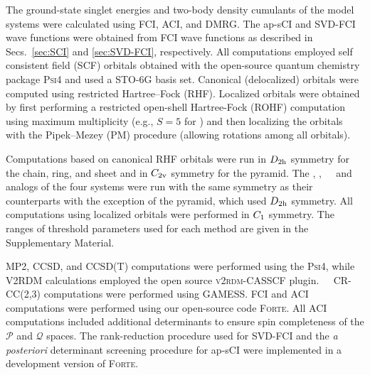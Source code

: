 \documentclass[aip,jcp,amsmath,amssymb, preprint]{revtex4-1}
\newcommand{\add}[1]{\colorbox{goodgreen}{\textcolor{white}{\footnotesize  \fontfamily{phv}\selectfont +}}
    \textcolor{goodgreen}{{#1}}\xspace}
\begin{document}
The ground-state singlet energies and two-body density cumulants of the model systems were calculated using FCI, ACI, and DMRG.
The ap-sCI and SVD-FCI wave functions were obtained from FCI wave functions as described in Secs.~\ref{sec:SCI} and \ref{sec:SVD-FCI}, respectively. 
All computations employed self consistent field (SCF) orbitals obtained with the open-source quantum chemistry package \textsc{Psi4}\cite{Parrish2017Psi4, smith2020psi4} and used a STO-6G basis set.\cite{Hehre1969ASelf}
Canonical (delocalized) orbitals were computed using restricted Hartree--Fock (RHF).
Localized orbitals were obtained by first performing a restricted open-shell Hartree-Fock  (ROHF) computation using maximum multiplicity (e.g., $S = 5$ for ) and then localizing the orbitals with the Pipek--Mezey (PM) \cite{Pipek1989FastIntrinsic} procedure (allowing rotations among all orbitals).

Computations based on canonical RHF orbitals were run in $D_{\rm{2h}}$ symmetry for the  chain, ring, and sheet and in $C_{2\rm{v}}$ symmetry for the  pyramid.
The , , \add{and } analogs of the four systems were run with the same symmetry as their  counterparts with the exception of the  pyramid, which used $D_{\rm{2h}}$ symmetry.   
All computations using localized orbitals were performed in $C_{\rm{1}}$ symmetry.
The ranges of threshold parameters used for each method are given in the Supplementary Material.

MP2, CCSD, and CCSD(T) computations were performed using the  \textsc{Psi4}, while V2RDM calculations employed the open source \textsc{v2rdm-CASSCF} plugin. \cite{Fosso2016LargeScale}  
\add{CR-CC(2,3) computations were performed using GAMESS.}\cite{barca2020recent}
FCI and ACI computations were performed using our open-source code \textsc{Forte}.\cite{Evangelista2019Forte}  
All ACI computations included additional determinants to ensure spin completeness of the $\mathcal{P}$ and $\mathcal{Q}$ spaces.
The rank-reduction procedure used for SVD-FCI and the \textit{a posteriori} determinant screening procedure for ap-sCI were  implemented in a development version of \textsc{Forte}.
\end{document}
